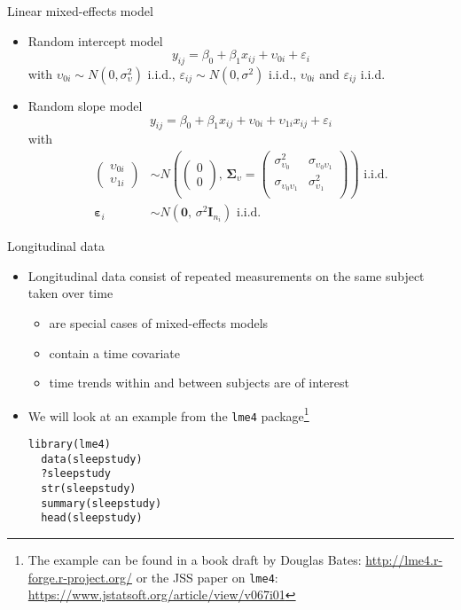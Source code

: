 \documentclass[aspectratio=169]{beamer}
\newcommand{\vect}[1]{\mathbf{#1}}
\newcommand{\mat}[1]{\mathbf{#1}}
\newcommand{\gvect}[1]{\boldsymbol{#1}}
\newcommand{\gmat}[1]{\boldsymbol{#1}}
\begin{document}
\begin{frame}{Linear mixed-effects model}
\begin{itemize}
  \item Random intercept model
\[y_{ij} = \beta_0 + \beta_1 x_{ij} + \upsilon_{0i} + \varepsilon_i\]
with $\upsilon_{0i} \sim N(0, \sigma^2_{\upsilon})$ i.i.d.,
$\varepsilon_{ij} \sim N(0, \sigma^2)$ i.i.d., $\upsilon_{0i}$ and
$\varepsilon_{ij}$ i.i.d.\\[2ex]
  \item Random slope model
\[y_{ij} = \beta_0 + \beta_1 x_{ij} + \upsilon_{0i} + \upsilon_{1i} x_{ij} + \varepsilon_i\]
with
\begin{align*}
  \begin{pmatrix} \upsilon_{0i}\\ \upsilon_{1i} \end{pmatrix} &\sim
    N \left(\begin{pmatrix} 0\\ 0 \end{pmatrix}, \, \gmat{\Sigma}_\upsilon =
      \begin{pmatrix}
        \sigma^2_{\upsilon_0} & \sigma_{\upsilon_0 \upsilon_1} \\
        \sigma_{\upsilon_0 \upsilon_1} & \sigma^2_{\upsilon_1} \\
      \end{pmatrix} \right)
    \text{ i.i.d.} \\
  \gvect{\varepsilon}_i &\sim N(\vect{0}, \, \sigma^2 \mat{I}_{n_i})
    \text{ i.i.d.}
\end{align*}
\end{itemize}
\end{frame}


\begin{frame}[fragile]{Longitudinal data}
  \begin{itemize}
    \item Longitudinal data consist of repeated measurements on the same
      subject taken over time
  \begin{itemize}
    \item are special cases of mixed-effects models
    \item contain a time covariate
    \item time trends within and between subjects are of interest
  \end{itemize}
\item We will look at an example from the \texttt{lme4}
  package\footnote{The example can be found in a book draft by Douglas
      Bates: \url{http://lme4.r-forge.r-project.org/} or the JSS paper on
      \texttt{lme4}: \url{https://www.jstatsoft.org/article/view/v067i01}}
  \begin{lstlisting}[style=plain]
  library(lme4)
  data(sleepstudy)
  ?sleepstudy
  str(sleepstudy)
  summary(sleepstudy)
  head(sleepstudy)
  \end{lstlisting}
  \end{itemize}
\nocite{Bates2010lme4}
\end{frame}
\end{document}
